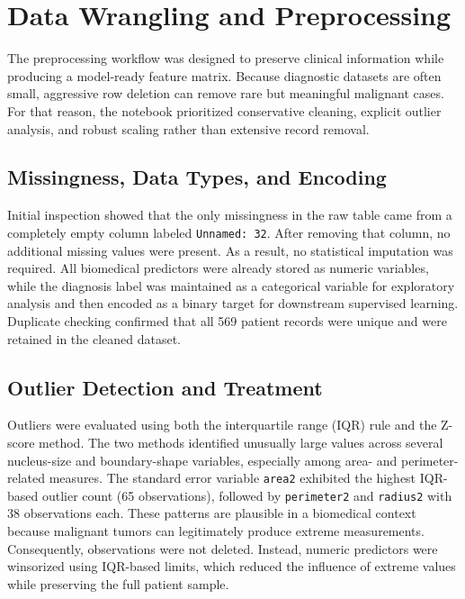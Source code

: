 \documentclass[conference]{IEEEtran}
\begin{document}
\section{Data Wrangling and Preprocessing}
The preprocessing workflow was designed to preserve clinical information while producing a model-ready feature matrix. Because diagnostic datasets are often small, aggressive row deletion can remove rare but meaningful malignant cases. For that reason, the notebook prioritized conservative cleaning, explicit outlier analysis, and robust scaling rather than extensive record removal.

\subsection{Missingness, Data Types, and Encoding}
Initial inspection showed that the only missingness in the raw table came from a completely empty column labeled \texttt{Unnamed: 32}. After removing that column, no additional missing values were present. As a result, no statistical imputation was required. All biomedical predictors were already stored as numeric variables, while the diagnosis label was maintained as a categorical variable for exploratory analysis and then encoded as a binary target for downstream supervised learning. Duplicate checking confirmed that all 569 patient records were unique and were retained in the cleaned dataset.

\subsection{Outlier Detection and Treatment}
Outliers were evaluated using both the interquartile range (IQR) rule and the Z-score method. The two methods identified unusually large values across several nucleus-size and boundary-shape variables, especially among area- and perimeter-related measures. The standard error variable \texttt{area2} exhibited the highest IQR-based outlier count (65 observations), followed by \texttt{perimeter2} and \texttt{radius2} with 38 observations each. These patterns are plausible in a biomedical context because malignant tumors can legitimately produce extreme measurements. Consequently, observations were not deleted. Instead, numeric predictors were winsorized using IQR-based limits, which reduced the influence of extreme values while preserving the full patient sample.
\end{document}
